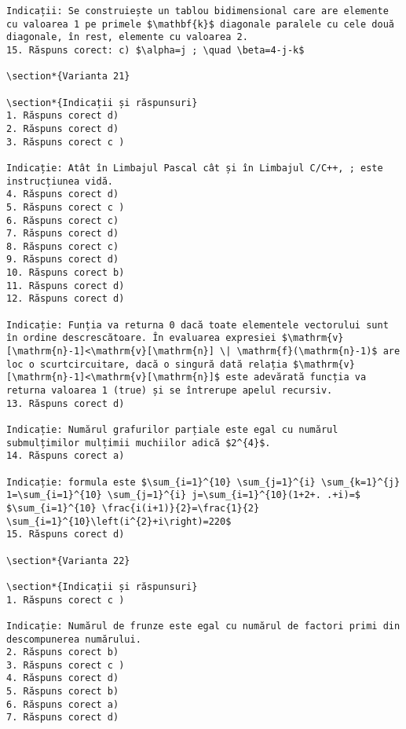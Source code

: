 \begin{verbatim}
Indicații: Se construiește un tablou bidimensional care are elemente cu valoarea 1 pe primele $\mathbf{k}$ diagonale paralele cu cele două diagonale, în rest, elemente cu valoarea 2.
15. Răspuns corect: c) $\alpha=j ; \quad \beta=4-j-k$

\section*{Varianta 21}

\section*{Indicații și răspunsuri}
1. Răspuns corect d)
2. Răspuns corect d)
3. Răspuns corect c )

Indicație: Atât în Limbajul Pascal cât și în Limbajul C/C++, ; este instrucțiunea vidă.
4. Răspuns corect d)
5. Răspuns corect c )
6. Răspuns corect c)
7. Răspuns corect d)
8. Răspuns corect c)
9. Răspuns corect d)
10. Răspuns corect b)
11. Răspuns corect d)
12. Răspuns corect d)

Indicație: Funția va returna 0 dacă toate elementele vectorului sunt în ordine descrescătoare. În evaluarea expresiei $\mathrm{v}[\mathrm{n}-1]<\mathrm{v}[\mathrm{n}] \| \mathrm{f}(\mathrm{n}-1)$ are loc o scurtcircuitare, dacă o singură dată relația $\mathrm{v}[\mathrm{n}-1]<\mathrm{v}[\mathrm{n}]$ este adevărată funcția va returna valoarea 1 (true) și se întrerupe apelul recursiv.
13. Răspuns corect d)

Indicație: Numărul grafurilor parțiale este egal cu numărul submulțimilor mulțimii muchiilor adică $2^{4}$.
14. Răspuns corect a)

Indicație: formula este $\sum_{i=1}^{10} \sum_{j=1}^{i} \sum_{k=1}^{j} 1=\sum_{i=1}^{10} \sum_{j=1}^{i} j=\sum_{i=1}^{10}(1+2+. .+i)=$ $\sum_{i=1}^{10} \frac{i(i+1)}{2}=\frac{1}{2} \sum_{i=1}^{10}\left(i^{2}+i\right)=220$
15. Răspuns corect d)

\section*{Varianta 22}

\section*{Indicații și răspunsuri}
1. Răspuns corect c )

Indicație: Numărul de frunze este egal cu numărul de factori primi din descompunerea numărului.
2. Răspuns corect b)
3. Răspuns corect c )
4. Răspuns corect d)
5. Răspuns corect b)
6. Răspuns corect a)
7. Răspuns corect d)


\end{verbatim}
